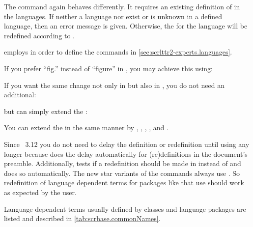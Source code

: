 The command  again behaves differently. It requires an
existing definition of  in the languages.  If neither
a language nor  exist or  is unknown in a
defined language, then an error message is given. Otherwise, the
 for the language will be redefined according to
.

\KOMAScript{} employs  in order to define the
commands in \autoref{sec:scrlttr2-experts.languages}.

\begin{Example}
  If you prefer ``fig.'' instead of ``figure'' in , you may
  achieve this using:
\begin{lstcode}
\end{lstcode}
  If you want the same change not only in  but also in
  , you do not need an additional:
\begin{lstcode}
\end{lstcode}
  but can simply extend the :
\begin{lstcode}
\end{lstcode}
  You can extend the  in the same manner by
  , , , ,
  and .
\end{Example}
  
Since \KOMAScript~3.12 you do not need to
delay the definition or redefinition until 
using  any longer because  does the
delay automatically for (re)definitions in the document's
preamble. Additionally,  tests if a redefinition should be
made in  instead of
 and does so automatically. The new star
variants of the commands always use . So
redefinition of language dependent terms for packages like 
that use  should work as expected by the user.

Language dependent terms usually defined by classes and language
packages are listed and described in \autoref{tab:scrbase.commonNames}.

